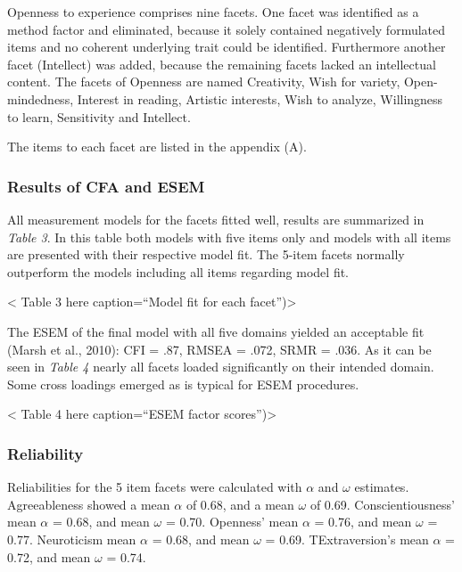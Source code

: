 \documentclass[,man,floatsintext]{apa6}
\theoremstyle{definition}
\theoremstyle{definition}
\theoremstyle{definition}
\theoremstyle{remark}
\begin{document}
Openness to experience comprises nine facets. One facet was identified
as a method factor and eliminated, because it solely contained
negatively formulated items and no coherent underlying trait could be
identified. Furthermore another facet (Intellect) was added, because the
remaining facets lacked an intellectual content. The facets of Openness
are named Creativity, Wish for variety, Open-mindedness, Interest in
reading, Artistic interests, Wish to analyze, Willingness to learn,
Sensitivity and Intellect.

The items to each facet are listed in the appendix (A).

\hypertarget{results-of-cfa-and-esem}{%
\subsubsection{Results of CFA and ESEM}\label{results-of-cfa-and-esem}}

All measurement models for the facets fitted well, results are
summarized in \emph{Table 3}. In this table both models with five items
only and models with all items are presented with their respective model
fit. The 5-item facets normally outperform the models including all
items regarding model fit.

\vspace{5mm}

\textless{} Table 3 here caption=\enquote{Model fit for each
facet})\textgreater{}

\vspace{5mm}

The ESEM of the final model with all five domains yielded an acceptable
fit (Marsh et al., 2010): CFI = .87, RMSEA = .072, SRMR = .036. As it
can be seen in \emph{Table 4} nearly all facets loaded significantly on
their intended domain. Some cross loadings emerged as is typical for
ESEM procedures.

\vspace{5mm}

\textless{} Table 4 here caption=\enquote{ESEM factor
scores})\textgreater{}

\vspace{5mm}

\hypertarget{reliability-1}{%
\subsubsection{Reliability}\label{reliability-1}}

Reliabilities for the 5 item facets were calculated with \(\alpha\) and
\(\omega\) estimates. Agreeableness showed a mean \(\alpha\) of 0.68,
and a mean \(\omega\) of 0.69. Conscientiousness' mean \(\alpha\) =
0.68, and mean \(\omega\) = 0.70. Openness' mean \(\alpha\) = 0.76, and
mean \(\omega\) = 0.77. Neuroticism mean \(\alpha\) = 0.68, and mean
\(\omega\) = 0.69. TExtraversion's mean \(\alpha\) = 0.72, and mean
\(\omega\) = 0.74.
\end{document}

